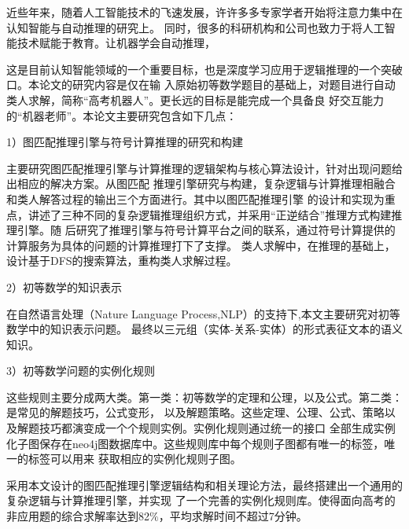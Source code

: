 \documentclass{standalone}
\begin{document}
	
\begin{chineseabstract}
近些年来，随着人工智能技术的飞速发展，许许多多专家学者开始将注意力集中在认知智能与自动推理的研究上。
同时，很多的科研机构和公司也致力于将人工智能技术赋能于教育。让机器学会自动推理，

这是目前认知智能领域的一个重要目标，也是深度学习应用于逻辑推理的一个突破口。本论文的研究内容是仅在输
入原始初等数学题目的基础上，对题目进行自动类人求解，简称“高考机器人”。更长远的目标是能完成一个具备良
好交互能力的“机器老师”。本论文主要研究包含如下几点：

1）图匹配推理引擎与符号计算推理的研究和构建

主要研究图匹配推理引擎与计算推理的逻辑架构与核心算法设计，针对出现问题给出相应的解决方案。从图匹配
推理引擎研究与构建，复杂逻辑与计算推理相融合和类人解答过程的输出三个方面进行。其中以图匹配推理引擎
的设计和实现为重点，讲述了三种不同的复杂逻辑推理组织方式，并采用“正逆结合”推理方式构建推理引擎。随
后研究了推理引擎与符号计算平台之间的联系，通过符号计算提供的计算服务为具体的问题的计算推理打下了支撑。
类人求解中，在推理的基础上，设计基于DFS的搜索算法，重构类人求解过程。

2）初等数学的知识表示

在自然语言处理（Nature Language Process,NLP）的支持下,本文主要研究对初等数学中的知识表示问题。
最终以三元组（实体-关系-实体）的形式表征文本的语义知识。

3）初等数学问题的实例化规则

这些规则主要分成两大类。第一类：初等数学的定理和公理，以及公式。第二类：是常见的解题技巧，公式变形，
以及解题策略。这些定理、公理、公式、策略以及解题技巧都演变成一个个规则实例。实例化规则通过统一的接口
全部生成实例化子图保存在neo4j图数据库中。这些规则库中每个规则子图都有唯一的标签，唯一的标签可以用来
获取相应的实例化规则子图。

采用本文设计的图匹配推理引擎逻辑结构和相关理论方法，最终搭建出一个通用的复杂逻辑与计算推理引擎，并实现
了一个完善的实例化规则库。使得面向高考的非应用题的综合求解率达到82$\%$，平均求解时间不超过7分钟。


\end{chineseabstract}
\end{document}
